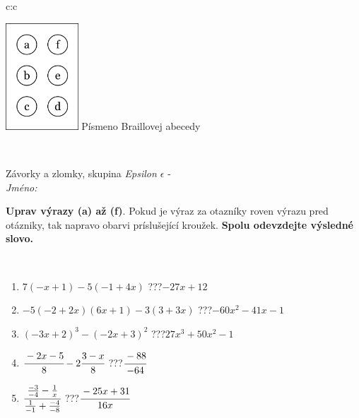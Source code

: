 \documentclass[10pt]{report}
\begin{document}
\begin{tabular}{c:c}
\begin{minipage}[c][104.5mm][t]{0.5\linewidth}
\begin{center}
\begin{minipage}{0.20\linewidth}
\begin{center}
\includegraphics[height=40mm]{../images/braille.png}
{\small Písmeno Braillovej abecedy}
\end{center}
\end{minipage}
\end{center}
\end{minipage}
\\ \hdashline
\begin{minipage}[c][104.5mm][t]{0.5\linewidth}
\begin{center}
\vspace{7mm}
{\huge Závorky a zlomky, skupina \textit{Epsilon $\epsilon$} -}\\[5mm]
\textit{Jméno:}\phantom{xxxxxxxxxxxxxxxxxxxxxxxxxxxxxxxxxxxxxxxxxxxxxxxxxxxxxxxxxxxxxxxxx}\\[5mm]
\begin{minipage}{0.95\linewidth}
\begin{center}
\textbf{Uprav výrazy (a) až (f)}. Pokud je výraz za otazníky roven výrazu pred otázniky, tak napravo obarvi príslušející kroužek. \textbf{Spolu odevzdejte výsledné slovo.}
\end{center}
\end{minipage}
\\[1mm]
\begin{minipage}{0.79\linewidth}
\begin{center}
\begin{varwidth}{\linewidth}
\begin{enumerate}
\normalsize
\item $7(-x+1)-5(-1+4x)$\quad \dotfill\; ???\;\dotfill \quad $-27x+12$
\item $-5(-2+2x)(6x+1)-3(3+3x)$\quad \dotfill\; ???\;\dotfill \quad $-60x^2-41x-1$
\item $(-3x+2)^3-(-2x+3)^2$\quad \dotfill\; ???\;\dotfill \quad $27x^3+50x^2-1$
\item $\cfrac{-2x-5}{8}-2\cfrac{3-x}{8}$\quad \dotfill\; ???\;\dotfill \quad $\cfrac{-88}{-64}$
\item $\cfrac{\frac{-3}{-4}-\frac{1}{x}}{\frac{1}{-1}+\frac{-4}{-8}}$\quad \dotfill\; ???\;\dotfill \quad $\cfrac{-25x+31}{16x}$

\end{enumerate}
\end{varwidth}
\end{center}
\end{minipage}
\end{center}
\end{minipage}
\end{tabular}
\end{document}
